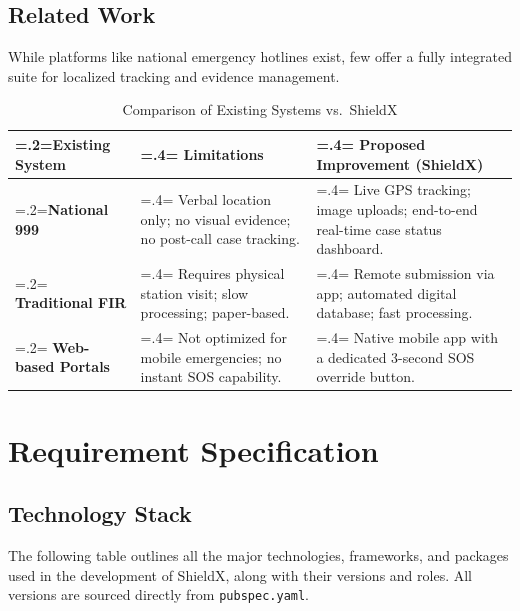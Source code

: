 \documentclass[11pt, a4paper]{report}
\begin{document}
\section{Related Work}
While platforms like national emergency hotlines exist, few offer a fully integrated suite for localized tracking and evidence management.

\begin{table}[ht]
\centering
\caption{Comparison of Existing Systems vs.\ ShieldX}
\label{tab:comparison}
\begin{tabularx}{\textwidth}{>{\hsize=.2\hsize\linewidth=\hsize}X >{\hsize=.4\hsize\linewidth=\hsize}X >{\hsize=.4\hsize\linewidth=\hsize}X}
\toprule
\textbf{Existing System} & \textbf{Limitations} & \textbf{Proposed Improvement (ShieldX)} \\
\midrule
\textbf{National 999} & Verbal location only; no visual evidence; no post-call case tracking. & Live GPS tracking; image uploads; end-to-end real-time case status dashboard. \\
\addlinespace
\textbf{Traditional FIR} & Requires physical station visit; slow processing; paper-based. & Remote submission via app; automated digital database; fast processing. \\
\addlinespace
\textbf{Web-based Portals} & Not optimized for mobile emergencies; no instant SOS capability. & Native mobile app with a dedicated 3-second SOS override button. \\
\bottomrule
\end{tabularx}
\end{table}

\chapter{Requirement Specification}

\section{Technology Stack}
The following table outlines all the major technologies, frameworks, and packages used in the development of ShieldX, along with their versions and roles. All versions are sourced directly from \texttt{pubspec.yaml}.
\end{document}
